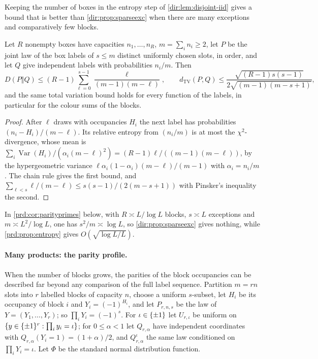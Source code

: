 Keeping the number of boxes in the entropy step of \cref{dir:lem:disjoint-iid} gives a bound that is better than
\cref{dir:prop:sparseexc} when there are many exceptions and comparatively few blocks.

\begin{proposition}\label{prd:prop:entropy}
Let $R$ nonempty boxes have capacities $n_1,\dots,n_R$, $m=\sum_in_i\ge2$, let $P$ be the joint law of the box
labels of $s\le m$ distinct uniformly chosen slots, in order, and let $Q$ give independent labels with
probabilities $n_i/m$. Then
\[
 D(P\Vert Q)\le(R-1)\sum_{\ell=0}^{s-1}\frac\ell{(m-1)(m-\ell)},\qquad
 d_{\mathrm{TV}}(P,Q)\le\frac{\sqrt{(R-1)s(s-1)}}{2\sqrt{(m-1)(m-s+1)}} ,
\]
and the same total variation bound holds for every function of the labels, in particular for the colour sums of
the blocks.
\end{proposition}

\begin{proof}
After $\ell$ draws with occupancies $H_i$ the next label has probabilities $(n_i-H_i)/(m-\ell)$. Its relative
entropy from $(n_i/m)$ is at most the $\chi^2$-divergence, whose mean is
$\sum_i\operatorname{Var}(H_i)/(\alpha_i(m-\ell)^2)=(R-1)\ell/((m-1)(m-\ell))$, by the hypergeometric variance
$\ell\alpha_i(1-\alpha_i)(m-\ell)/(m-1)$ with $\alpha_i=n_i/m$. The chain rule gives the first bound, and
$\sum_{\ell<s}\ell/(m-\ell)\le s(s-1)/(2(m-s+1))$ with Pinsker's inequality the second.
\end{proof}

In \cref{prd:cor:parityprimes} below, with $R\asymp L/\log L$ blocks, $s\asymp L$ exceptions and
$m\asymp L^2/\log L$, one has $s^2/m\asymp\log L$, so \cref{dir:prop:sparseexc} gives nothing, while
\cref{prd:prop:entropy} gives $O(\sqrt{\log L/L})$.

\paragraph{Many products: the parity profile.} When the number of blocks grows, the parities of the block
occupancies can be described far beyond any comparison of the full label sequence. Partition $m=rn$ slots into
$r$ labelled blocks of capacity $n$, choose a uniform $s$-subset, let $H_i$ be its occupancy of block $i$ and
$Y_i=(-1)^{H_i}$, and let $P_{r,n,s}$ be the law of $Y=(Y_1,\dots,Y_r)$; so $\prod_iY_i=(-1)^s$. For
$\iota\in\{\pm1\}$ let $U_{r,\iota}$ be uniform on $\{y\in\{\pm1\}^r:\prod_iy_i=\iota\}$; for $0\le\alpha<1$ let
$Q_{r,\alpha}$ have independent coordinates with $Q_{r,\alpha}(Y_i=1)=(1+\alpha)/2$, and $Q_{r,\alpha}^\iota$ the same
law conditioned on $\prod_iY_i=\iota$. Let $\Phi$ be the standard normal distribution function.

